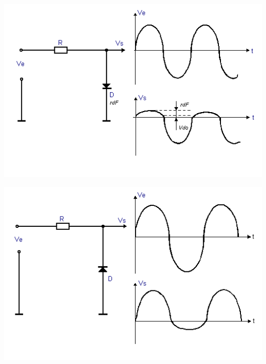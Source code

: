 \begin{minipage}[c]{.49\textwidth}
	\centering
	\includegraphics[width=\textwidth]{figures/ecret_pos.png}
	\label{fig:ecret_pos}
\end{minipage}
\hfill
\begin{minipage}[c]{.49\textwidth}
	\centering
	\includegraphics[width=\textwidth]{figures/ecret_neg.png}
	\label{fig:ecret_neg}
\end{minipage}
\vspace{1cm}